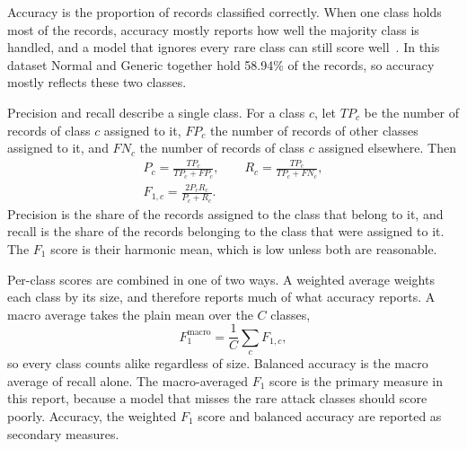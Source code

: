 \documentclass[conference,10pt]{IEEEtran}
\begin{document}
Accuracy is the proportion of records classified correctly. When one class
holds most of the records, accuracy mostly reports how well the majority
class is handled, and a model that ignores every rare class can still score
well~\cite{he2009learning}. In this dataset Normal and Generic together hold
58.94\% of the records, so accuracy mostly reflects these two classes.

Precision and recall describe a single class. For a class $c$, let $TP_c$
be the number of records of class $c$ assigned to it, $FP_c$ the number of
records of other classes assigned to it, and $FN_c$ the number of records of
class $c$ assigned elsewhere. Then
\begin{equation}
  \begin{gathered}
    P_c = \frac{TP_c}{TP_c + FP_c}, \qquad
    R_c = \frac{TP_c}{TP_c + FN_c}, \\
    F_{1,c} = \frac{2 P_c R_c}{P_c + R_c} .
  \end{gathered}
\end{equation}
Precision is the share of the records assigned to the class that belong to
it, and recall is the share of the records belonging to the class that were
assigned to it. The $F_1$ score is their harmonic mean, which is low unless
both are reasonable.

Per-class scores are combined in one of two ways. A weighted average weights
each class by its size, and therefore reports much of what accuracy reports.
A macro average takes the plain mean over the $C$ classes,
\begin{equation}
  F_1^{\text{macro}} = \frac{1}{C} \sum_{c} F_{1,c},
\end{equation}
so every class counts alike regardless of size. Balanced accuracy is the
macro average of recall alone. The macro-averaged $F_1$ score is the primary
measure in this report, because a model that misses the rare attack classes
should score poorly. Accuracy, the weighted $F_1$ score and balanced
accuracy are reported as secondary measures. 
\end{document}
